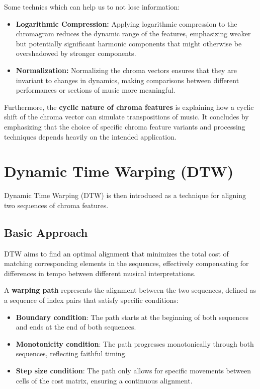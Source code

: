 \documentclass[a4paper, 9pt, twocolumn]{extarticle}
\begin{document}
    Some technics which can help us to not lose information:
    
\begin{itemize}
    \item
      \textbf{Logarithmic Compression:} Applying logarithmic compression to
      the chromagram reduces the dynamic range of the features, emphasizing
      weaker but potentially significant harmonic components that might
      otherwise be overshadowed by stronger components.
    \item
      \textbf{Normalization:} Normalizing the chroma vectors ensures that
      they are invariant to changes in dynamics, making comparisons between
      different performances or sections of music more meaningful.
    \end{itemize}
    
    Furthermore, the \textbf{cyclic nature of chroma features} is explaining
    how a cyclic shift of the chroma vector can simulate transpositions of
    music. It concludes by emphasizing that the choice of specific chroma
    feature variants and processing techniques depends heavily on the
    intended application.

    \section{Dynamic Time Warping (DTW)}
   Dynamic Time Warping (DTW) is then introduced as a technique
    for aligning two sequences of chroma features.
    \subsection{ Basic Approach}
    DTW aims to find an optimal alignment that minimizes the total cost of matching
    corresponding elements in the sequences, effectively compensating for
    differences in tempo between different musical interpretations.
    
    A \textbf{warping path} represents the alignment between the two
    sequences, defined as a sequence of index pairs that satisfy specific
    conditions:
    
    \begin{itemize}
    \item
      \textbf{Boundary condition}: The path starts at the beginning of both
      sequences and ends at the end of both sequences.
    \item
      \textbf{Monotonicity condition}: The path progresses monotonically
      through both sequences, reflecting faithful timing.
    \item
      \textbf{Step size condition}: The path only allows for specific
      movements between cells of the cost matrix, ensuring a continuous
      alignment.
    \end{itemize}
    
\end{document}
